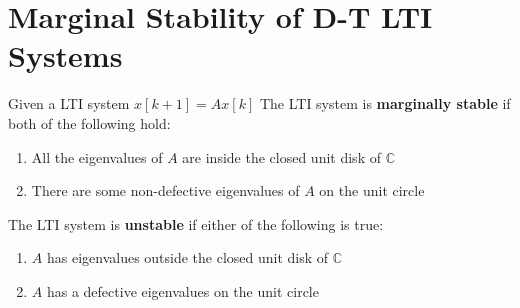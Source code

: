 \documentclass[10pt,a4paper,oneside]{article}
\begin{document}
\section{Marginal Stability of D-T LTI Systems}
Given a LTI system $x[k+1]=Ax[k]$
The LTI system is {\bfseries marginally stable} if both of the following hold:
\begin{enumerate}
\item All the eigenvalues of $A$ are inside the closed unit disk of $\mathbb{C}$
\item There are some non-defective eigenvalues of $A$ on the unit circle
\end{enumerate}
The LTI system is {\bfseries unstable} if either of the following is true:
\begin{enumerate}
\item $A$ has eigenvalues outside the closed unit disk of $\mathbb{C}$
\item $A$ has a defective eigenvalues on the unit circle
\end{enumerate}
\end{document}
